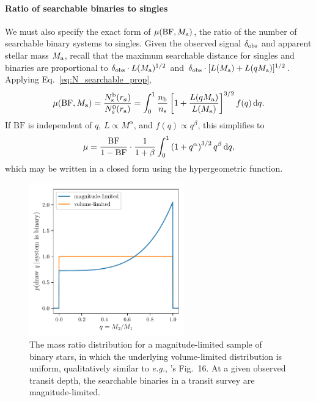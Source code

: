 \documentclass[12pt,modern]{aastex61}
\renewcommand{\a}{_{\rm a}}
\newcommand{\s}{_{\rm s}}
\begin{document}
\paragraph{Ratio of searchable binaries to singles}
We must also specify the exact form of $\mu({\rm BF},M\a)$, the ratio of 
the number of searchable binary systems to singles.
Given the observed signal $\delta_{\rm obs}$ and apparent stellar mass $M\a$, 
recall that the maximum searchable distance for singles and binaries are 
proportional to $\delta_{\rm obs}\cdot L(M\a)^{1/2}$ and $\delta_{\rm 
obs}\cdot [L(M\a)+L(qM\a)]^{1/2}$.
Applying Eq.~\ref{eq:N_searchable_prop},
\begin{equation}
\mu({\rm BF},M\a) = 
\frac{N\s^{\rm b}(r_a)}{N_s^0(r\a)}=
\int_0^1 {n_{\rm b}\over n_{\rm s}}\left[1+{L(qM\a) \over L(M\a)}\right]^{3/2} 
f(q)\,\mathrm{d}q.
\label{eq:mu_general}
\end{equation}
If $\mathrm{BF}$ is independent of $q$, $L \propto M^\alpha$, and $f(q) 
\propto q^\beta$, this simplifies to
\begin{equation}
\mu =\frac{{\rm BF}}{1 - {\rm BF}}\cdot {1\over{1+\beta}}\int_0^1 
\left(1+q^\alpha\right)^{3/2} q^\beta \,\mathrm{d}q,
\label{eq:mu_power_laws}
\end{equation}
which may be written in a closed form using the hypergeometric function.

\begin{figure}[!tb]
    \centering
    \includegraphics[width=0.6\textwidth]{figures/mass_ratio_distribution.pdf}
    \caption{
        The mass ratio distribution for a magnitude-limited sample of 
        binary stars, in which the underlying volume-limited distribution is 
        uniform, qualitatively similar to {\it e.g.}, 
        \citet{raghavan_survey_2010}'s Fig.~16.
        At a given observed transit depth, the searchable binaries in a 
        transit survey are magnitude-limited.
    }
    \label{fig:q_distribn_mag_limited}
\end{figure}
\end{document}
